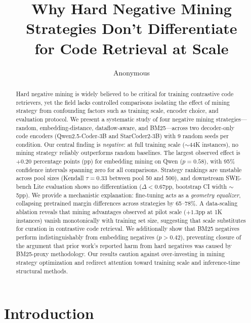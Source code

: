 \documentclass[11pt,a4paper]{article}
\title{Why Hard Negative Mining Strategies Don't Differentiate\\for Code Retrieval at Scale}
\author{Anonymous}
\begin{document}
\maketitle

\begin{abstract}
Hard negative mining is widely believed to be critical for training contrastive code retrievers, yet the field lacks controlled comparisons isolating the effect of mining strategy from confounding factors such as training scale, encoder choice, and evaluation protocol.
We present a systematic study of four negative mining strategies---random, embedding-distance, dataflow-aware, and BM25---across two decoder-only code encoders (Qwen2.5-Coder-3B and StarCoder2-3B) with 9 random seeds per condition.
Our central finding is \emph{negative}: at full training scale ($\sim$44K instances), no mining strategy reliably outperforms random baselines.
The largest observed effect is $+0.20$ percentage points (pp) for embedding mining on Qwen ($p=0.58$), with 95\% confidence intervals spanning zero for all comparisons.
Strategy rankings are unstable across pool sizes (Kendall $\tau=0.33$ between pool 50 and 500), and downstream SWE-bench Lite evaluation shows no differentiation ($\Delta < 0.67$pp, bootstrap CI width $\sim$5pp).
We provide a mechanistic explanation: fine-tuning acts as a \emph{geometry equalizer}, collapsing pretrained margin differences across strategies by 65--78\%.
A data-scaling ablation reveals that mining advantages observed at pilot scale ($+1.3$pp at 1K instances) vanish monotonically with training set size, suggesting that scale substitutes for curation in contrastive code retrieval.
We additionally show that BM25 negatives perform indistinguishably from embedding negatives ($p > 0.42$), preventing closure of the argument that prior work's reported harm from hard negatives was caused by BM25-proxy methodology.
Our results caution against over-investing in mining strategy optimization and redirect attention toward training scale and inference-time structural methods.
\end{abstract}

\section{Introduction}
\label{sec:intro}
\end{document}
